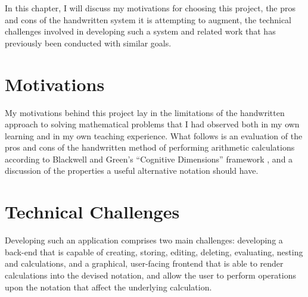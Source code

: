 \documentclass[12pt,twoside,notitlepage,xetex]{report}
\begin{document}
In this chapter, I will discuss my motivations for choosing this project, the
pros and cons of the handwritten system it is attempting to augment, the
technical challenges involved in developing such a system and related work that
has previously been conducted with similar goals.

\section{Motivations}

My motivations behind this project lay in the limitations of the handwritten
approach to solving mathematical problems that I had observed both in my own
learning and in my own teaching experience.  What follows is an evaluation of
the pros and cons of the handwritten method of performing arithmetic
calculations according to Blackwell and Green's ``Cognitive Dimensions''
framework \cite{Blackwell1998}, and a discussion of the properties a useful
alternative notation should have.

\pagebreak



\section{Technical Challenges}

Developing such an application comprises two main challenges: developing a
back-end that is capable of creating, storing, editing, deleting, evaluating,
nesting and calculations, and a graphical, user-facing frontend that is able to
render calculations into the devised notation, and allow the user to perform
operations upon the notation that affect the underlying calculation.
\end{document}
